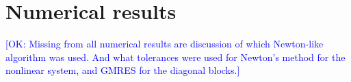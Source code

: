 \documentclass[review]{siamart}
\newcommand{\OK}[1]{\textcolor{blue}{[OK: #1]}}
\begin{document}
\section{Numerical results}\label{sec:numerics}

\OK{Missing from all numerical results are discussion of which Newton-like algorithm was used. And what tolerances were used for Newton's method for the nonlinear system, and GMRES for the diagonal blocks.}

\end{document}
